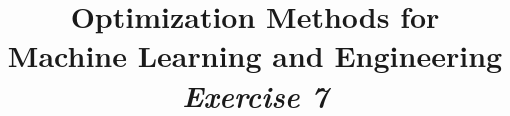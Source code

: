 




\author{}
\date{}
\title{Optimization Methods for \\Machine Learning and Engineering\\\vspace{0.5cm}\textit{Exercise 7}}
\maketitle


\setcounter{section}{7}
\setcounter{exercise}{0}


%
%
